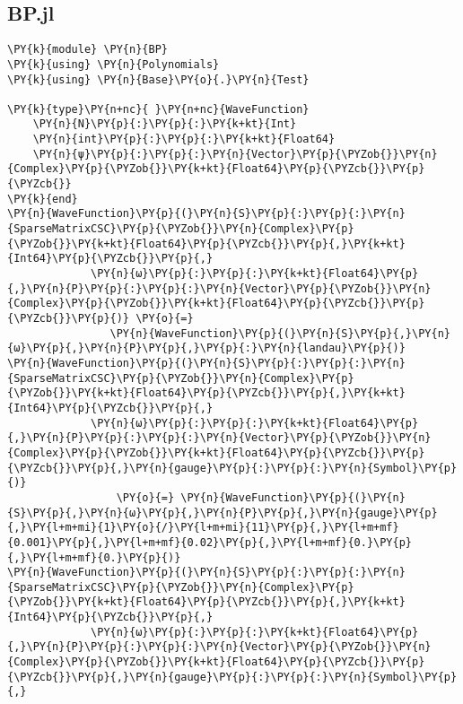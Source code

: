 \subsection{BP.jl}\label{subsec:bp}

\begin{Verbatim}[commandchars=\\\{\}]
\PY{k}{module} \PY{n}{BP}
\PY{k}{using} \PY{n}{Polynomials}
\PY{k}{using} \PY{n}{Base}\PY{o}{.}\PY{n}{Test}

\PY{k}{type}\PY{n+nc}{ }\PY{n+nc}{WaveFunction}
    \PY{n}{N}\PY{p}{:}\PY{p}{:}\PY{k+kt}{Int}
    \PY{n}{int}\PY{p}{:}\PY{p}{:}\PY{k+kt}{Float64}
    \PY{n}{ψ}\PY{p}{:}\PY{p}{:}\PY{n}{Vector}\PY{p}{\PYZob{}}\PY{n}{Complex}\PY{p}{\PYZob{}}\PY{k+kt}{Float64}\PY{p}{\PYZcb{}}\PY{p}{\PYZcb{}}
\PY{k}{end}
\PY{n}{WaveFunction}\PY{p}{(}\PY{n}{S}\PY{p}{:}\PY{p}{:}\PY{n}{SparseMatrixCSC}\PY{p}{\PYZob{}}\PY{n}{Complex}\PY{p}{\PYZob{}}\PY{k+kt}{Float64}\PY{p}{\PYZcb{}}\PY{p}{,}\PY{k+kt}{Int64}\PY{p}{\PYZcb{}}\PY{p}{,}
             \PY{n}{ω}\PY{p}{:}\PY{p}{:}\PY{k+kt}{Float64}\PY{p}{,}\PY{n}{P}\PY{p}{:}\PY{p}{:}\PY{n}{Vector}\PY{p}{\PYZob{}}\PY{n}{Complex}\PY{p}{\PYZob{}}\PY{k+kt}{Float64}\PY{p}{\PYZcb{}}\PY{p}{\PYZcb{}}\PY{p}{)} \PY{o}{=}
                \PY{n}{WaveFunction}\PY{p}{(}\PY{n}{S}\PY{p}{,}\PY{n}{ω}\PY{p}{,}\PY{n}{P}\PY{p}{,}\PY{p}{:}\PY{n}{landau}\PY{p}{)}
\PY{n}{WaveFunction}\PY{p}{(}\PY{n}{S}\PY{p}{:}\PY{p}{:}\PY{n}{SparseMatrixCSC}\PY{p}{\PYZob{}}\PY{n}{Complex}\PY{p}{\PYZob{}}\PY{k+kt}{Float64}\PY{p}{\PYZcb{}}\PY{p}{,}\PY{k+kt}{Int64}\PY{p}{\PYZcb{}}\PY{p}{,}
             \PY{n}{ω}\PY{p}{:}\PY{p}{:}\PY{k+kt}{Float64}\PY{p}{,}\PY{n}{P}\PY{p}{:}\PY{p}{:}\PY{n}{Vector}\PY{p}{\PYZob{}}\PY{n}{Complex}\PY{p}{\PYZob{}}\PY{k+kt}{Float64}\PY{p}{\PYZcb{}}\PY{p}{\PYZcb{}}\PY{p}{,}\PY{n}{gauge}\PY{p}{:}\PY{p}{:}\PY{n}{Symbol}\PY{p}{)}
                 \PY{o}{=} \PY{n}{WaveFunction}\PY{p}{(}\PY{n}{S}\PY{p}{,}\PY{n}{ω}\PY{p}{,}\PY{n}{P}\PY{p}{,}\PY{n}{gauge}\PY{p}{,}\PY{l+m+mi}{1}\PY{o}{/}\PY{l+m+mi}{11}\PY{p}{,}\PY{l+m+mf}{0.001}\PY{p}{,}\PY{l+m+mf}{0.02}\PY{p}{,}\PY{l+m+mf}{0.}\PY{p}{,}\PY{l+m+mf}{0.}\PY{p}{)}
\PY{n}{WaveFunction}\PY{p}{(}\PY{n}{S}\PY{p}{:}\PY{p}{:}\PY{n}{SparseMatrixCSC}\PY{p}{\PYZob{}}\PY{n}{Complex}\PY{p}{\PYZob{}}\PY{k+kt}{Float64}\PY{p}{\PYZcb{}}\PY{p}{,}\PY{k+kt}{Int64}\PY{p}{\PYZcb{}}\PY{p}{,}
             \PY{n}{ω}\PY{p}{:}\PY{p}{:}\PY{k+kt}{Float64}\PY{p}{,}\PY{n}{P}\PY{p}{:}\PY{p}{:}\PY{n}{Vector}\PY{p}{\PYZob{}}\PY{n}{Complex}\PY{p}{\PYZob{}}\PY{k+kt}{Float64}\PY{p}{\PYZcb{}}\PY{p}{\PYZcb{}}\PY{p}{,}\PY{n}{gauge}\PY{p}{:}\PY{p}{:}\PY{n}{Symbol}\PY{p}{,}

\end{Verbatim}

